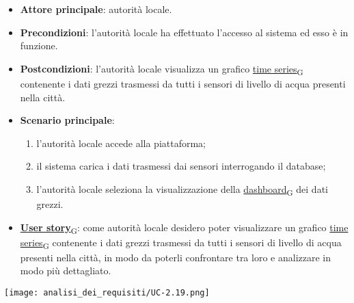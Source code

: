 \begin{itemize}
	\item \textbf{Attore principale}: autorità locale.
	\item \textbf{Precondizioni}: l'autorità locale ha effettuato l'accesso al sistema ed esso è in funzione.
	\item \textbf{Postcondizioni}: l'autorità locale visualizza un grafico \href{https://7last.github.io/docs/rtb/documentazione-interna/glossario\#time-series}{time series\textsubscript{G}} contenente i dati grezzi trasmessi da tutti i sensori
	      di livello di acqua presenti nella città.
	\item \textbf{Scenario principale}:
	      \begin{enumerate}
		      \item l'autorità locale accede alla piattaforma;
		      \item il sistema carica i dati trasmessi dai sensori interrogando il database;
		      \item l'autorità locale seleziona la visualizzazione della \href{https://7last.github.io/docs/rtb/documentazione-interna/glossario\#dashboard}{dashboard\textsubscript{G}} dei dati grezzi.
	      \end{enumerate}
	\item \href{https://7last.github.io/docs/rtb/documentazione-interna/glossario\#user-story}{\textbf{User story}\textsubscript{G}}:
	      come autorità locale desidero poter visualizzare un grafico \href{https://7last.github.io/docs/rtb/documentazione-interna/glossario\#time-series}{time series\textsubscript{G}} contenente i dati grezzi trasmessi da tutti i sensori
	      di livello di acqua presenti nella città, in modo da poterli confrontare tra loro e analizzare in modo più dettagliato.
\end{itemize}
\begin{center}
	\texttt{[image: analisi\_dei\_requisiti/UC-2.19.png]}
\end{center}

\newpage


